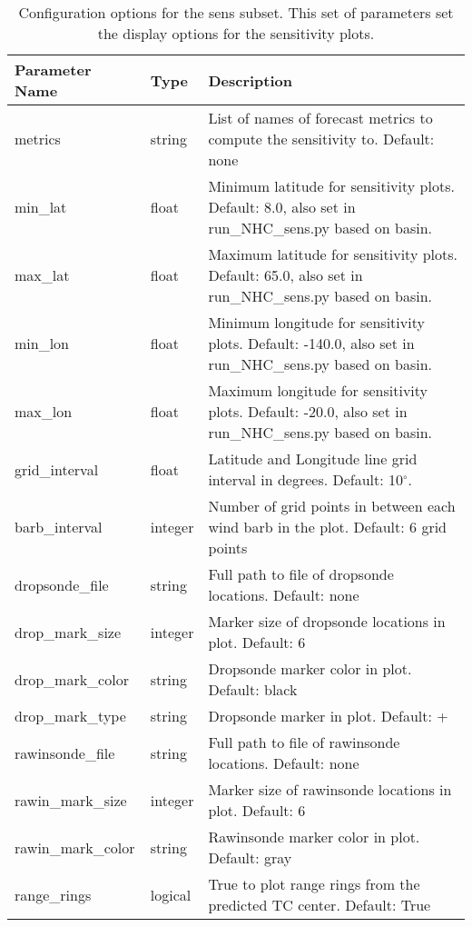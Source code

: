 \documentclass[psfig,12pt]{article}
\begin{document}
\begin{table}[H]
\caption{Configuration options for the sens subset.  This set of parameters set the display options
for the sensitivity plots.}
\begin{center}
\begin{tabular}{|p{1.25in}|p{0.5in}|p{4.5in}|}
\hline
Parameter Name & Type & Description \\  \hline \hline
metrics & string & List of names of forecast metrics to compute the sensitivity to.  
Default:  none \\ \hline
min\_lat & float & Minimum latitude for sensitivity plots.  Default:  8.0, also set in
run\_NHC\_sens.py based on basin.  \\ \hline
max\_lat & float & Maximum latitude for sensitivity plots.  Default:  65.0, also set in
run\_NHC\_sens.py based on basin.  \\ \hline
min\_lon & float & Minimum longitude for sensitivity plots.  Default:  -140.0, also set in 
run\_NHC\_sens.py based on basin.  \\ \hline
max\_lon & float & Maximum longitude for sensitivity plots.  Default:  -20.0, also set in
run\_NHC\_sens.py based on basin.  \\ \hline
grid\_interval & float & Latitude and Longitude line grid interval in degrees.
Default:  10$^{\circ}$.  \\ \hline
barb\_interval & integer & Number of grid points in between each wind barb in the plot.
Default:  6 grid points  \\ \hline
dropsonde\_file & string & Full path to file of dropsonde locations.  Default:  none \\ \hline
drop\_mark\_size & integer &  Marker size of dropsonde locations in plot.  Default:  6 \\ \hline
drop\_mark\_color & string & Dropsonde marker color in plot.  Default: black \\ \hline
drop\_mark\_type & string & Dropsonde marker in plot.  Default: + \\ \hline
rawinsonde\_file & string & Full path to file of rawinsonde locations.  Default:  none \\ \hline
rawin\_mark\_size & integer & Marker size of rawinsonde locations in plot.  Default:  6 \\ \hline
rawin\_mark\_color & string & Rawinsonde marker color in plot.  Default: gray \\ \hline
range\_rings & logical & True to plot range rings from the predicted TC center.  Default: True \\ \hline

\end{tabular}
\end{center}
\end{table}
\end{document}
